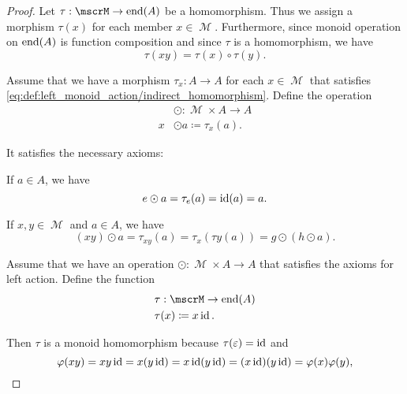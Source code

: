 \begin{proof}
   Let \( \tau: \mscrM \to \End(A) \) be a homomorphism. Thus we assign a morphism \( \tau(x) \) for each member \( x \in \mscrM \). Furthermore, since monoid operation on \( \operatorname{end}(A) \) is function composition and since \( \tau \) is a homomorphism, we have
  \begin{equation*}
    \tau(xy) = \tau(x) \circ \tau(y).
  \end{equation*}

   Assume that we have a morphism \( \tau_x: A \to A \) for each \( x \in \mscrM \) that satisfies \eqref{eq:def:left_monoid_action/indirect_homomorphism}. Define the operation
  \begin{align*}
    {}&\odot{}: \mscrM \times A \to A \\
    x &\odot a \coloneqq \tau_x(a).
  \end{align*}

  It satisfies the necessary axioms:
  \begin{refenum}
     If \( a \in A \), we have
    \begin{equation*}
      e \odot a
      =
      \tau_e(a)
      =
      \operatorname{id}(a)
      =
      a.
    \end{equation*}

     If \( x, y \in \mscrM \) and \( a \in A \), we have
    \begin{equation*}
      (x y) \odot a
      =
      \tau_{x y}(a)
      =
      \tau_{x}(\tau{y}(a))
      =
      g \odot (h \odot a).
    \end{equation*}
  \end{refenum}

   Assume that we have an operation \( \odot: \mscrM \times A \to A \) that satisfies the axioms for left action. Define the function
  \begin{align*}
    &\tau: \mscrM \to \End(A) \\
    &\tau(x) \coloneqq x \id.
  \end{align*}

  Then \( \tau \) is a monoid homomorphism because \( \tau(\varepsilon) = \operatorname{id} \) and
  \begin{equation}\label{def:left_monoid_action/homomorphism/proof}
    \varphi(xy)
    =
    xy \operatorname{id}
    =
    x (y \operatorname{id})
    =
    x \operatorname{id} (y \operatorname{id})
    =
    (x \operatorname{id}) (y \operatorname{id})
    =
    \varphi(x) \varphi(y),
  \end{equation}
\end{proof}

